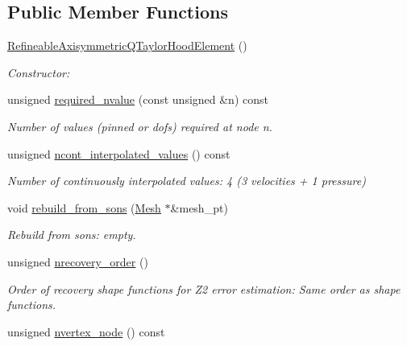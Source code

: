 \subsection*{Public Member Functions}
\begin{DoxyCompactItemize}
\item 
\hyperlink{classoomph_1_1RefineableAxisymmetricQTaylorHoodElement_a569f6f6fffca13180c20a66090ba0ddd}{Refineable\+Axisymmetric\+Q\+Taylor\+Hood\+Element} ()
\begin{DoxyCompactList}\small\item\em Constructor\+: \end{DoxyCompactList}\item 
unsigned \hyperlink{classoomph_1_1RefineableAxisymmetricQTaylorHoodElement_a3a7d2c7272f30b217c992b2c90ce8881}{required\+\_\+nvalue} (const unsigned \&n) const
\begin{DoxyCompactList}\small\item\em Number of values (pinned or dofs) required at node n. \end{DoxyCompactList}\item 
unsigned \hyperlink{classoomph_1_1RefineableAxisymmetricQTaylorHoodElement_af1fe431fc8cdb9df1533b58bef408c49}{ncont\+\_\+interpolated\+\_\+values} () const
\begin{DoxyCompactList}\small\item\em Number of continuously interpolated values\+: 4 (3 velocities + 1 pressure) \end{DoxyCompactList}\item 
void \hyperlink{classoomph_1_1RefineableAxisymmetricQTaylorHoodElement_a72b408f405d92ec892af7c0d74e913a7}{rebuild\+\_\+from\+\_\+sons} (\hyperlink{classoomph_1_1Mesh}{Mesh} $\ast$\&mesh\+\_\+pt)
\begin{DoxyCompactList}\small\item\em Rebuild from sons\+: empty. \end{DoxyCompactList}\item 
unsigned \hyperlink{classoomph_1_1RefineableAxisymmetricQTaylorHoodElement_a76415a2111375cf4b88cea3b2ade9c68}{nrecovery\+\_\+order} ()
\begin{DoxyCompactList}\small\item\em Order of recovery shape functions for Z2 error estimation\+: Same order as shape functions. \end{DoxyCompactList}\item 
unsigned \hyperlink{classoomph_1_1RefineableAxisymmetricQTaylorHoodElement_ae60cce9a7c941a9e82ef31d1da23908b}{nvertex\+\_\+node} () const

\end{DoxyCompactItemize}
